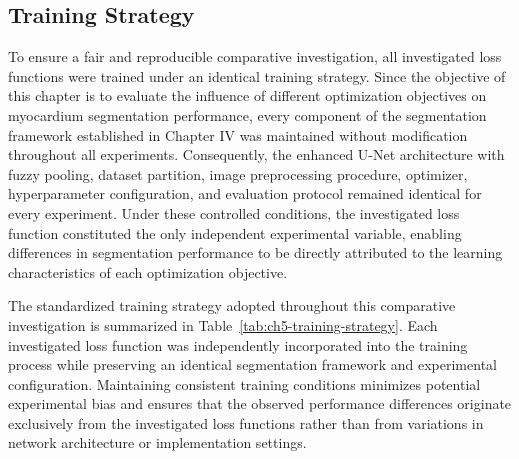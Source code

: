 \subsection{Training Strategy }
\label{subsec:ch5-Training-Strategy}

To ensure a fair and reproducible comparative investigation, all investigated loss functions were trained under an identical training strategy. Since the objective of this chapter is to evaluate the influence of different optimization objectives on myocardium segmentation performance, every component of the segmentation framework established in Chapter IV was maintained without modification throughout all experiments. Consequently, the enhanced U-Net architecture with fuzzy pooling, dataset partition, image preprocessing procedure, optimizer, hyperparameter configuration, and evaluation protocol remained identical for every experiment. Under these controlled conditions, the investigated loss function constituted the only independent experimental variable, enabling differences in segmentation performance to be directly attributed to the learning characteristics of each optimization objective. 

The standardized training strategy adopted throughout this comparative investigation is summarized in Table~\ref{tab:ch5-training-strategy}. Each investigated loss function was independently incorporated into the training process while preserving an identical segmentation framework and experimental configuration. Maintaining consistent training conditions minimizes potential experimental bias and ensures that the observed performance differences originate exclusively from the investigated loss functions rather than from variations in network architecture or implementation settings.

